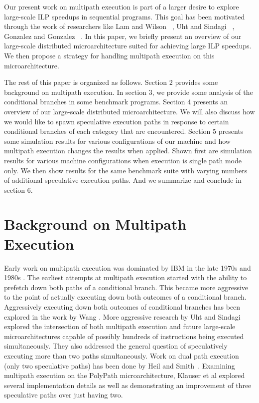 \documentclass[10pt,dvips]{article}
\begin{document}
Our present work on multipath execution is part of a larger
desire to explore large-scale ILP speedups in sequential programs.
This goal has been motivated through the work of researchers like
Lam and Wilson ~\cite{Lam92},
Uht and Sindagi ~\cite{Uht95},
Gonzalez and Gonzalez ~\cite{Gon97}.
In this paper, we briefly present an overview of our large-scale distributed
microarchitecture suited for achieving large ILP speedups.  
We then propose a strategy for handling
multipath execution on this microarchitecture.

The rest of this paper is organized as follows.
Section 2 provides some background on multipath execution.
In section 3, we provide some analysis of the conditional
branches in some benchmark programs.  
Section 4 presents an overview of our large-scale distributed
microarchitecture.
We will also discuss how we
would like to 
spawn speculative execution paths
in response to certain conditional branches of each category that 
are encountered.
Section 5 presents some simulation results for various
configurations of our machine and how multipath execution
changes the results when applied.  Shown first are simulation
results for various machine configurations when execution is
single path mode only.  We then show results for
the same benchmark suite with varying numbers of additional
speculative execution paths.
And we summarize and conclude in section 6.
%
\section{Background on Multipath Execution}
%
Early work on multipath execution was
dominated by IBM in the
late 1970s and 1980s \cite{Conners79}.
The earliest attempts at multipath
execution started with the ability to prefetch down both
paths of a conditional branch.  This became more aggressive
to the point of actually executing down both outcomes of
a conditional branch.  Aggressively executing down both outcomes
of conditional branches has been explored in the work
by Wang \cite{Wang90}.  
More aggressive research by Uht and
Sindagi \cite{Uht95} explored the intersection of both
multipath execution and future large-scale microarchitectures
capable of possibly hundreds of instructions being executed simultaneously.
They also addressed the general question of speculatively executing
more than two paths simultaneously.
Work on dual path execution (only two speculative paths) has
been done by Heil and Smith~\cite{Heil96}.
Examining multipath execution on the PolyPath microarchitecture,
Klauser et al explored several implementation details
as well as demonstrating an improvement of three speculative paths
over just having two.
\end{document}
